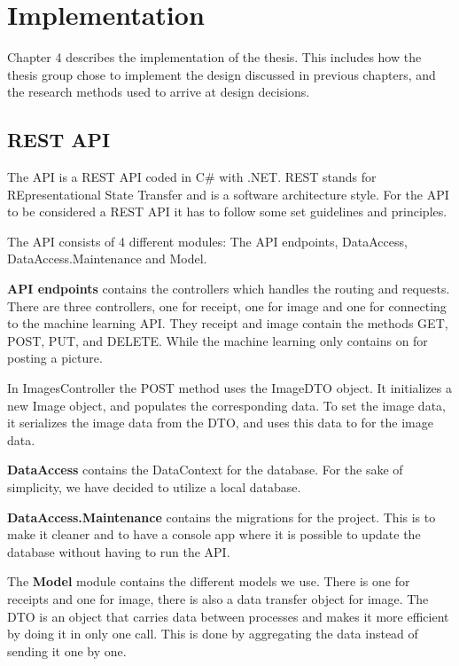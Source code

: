 \cleardoublepage
\chapter{Implementation}
\label{ch:implementation}
Chapter 4 describes the implementation of the thesis.
This includes how the thesis group chose to implement the design discussed in previous chapters, and the research methods used to arrive at design decisions.

\section{REST API}\label{sec:REST API}

The API is a REST API coded in C\# with .NET.
REST stands for REpresentational State Transfer and is a software architecture style.
For the API to be considered a REST API it has to follow some set guidelines and principles.

The API consists of 4 different modules: The API endpoints, DataAccess,\\
DataAccess.Maintenance and Model.

\textbf{API endpoints} contains the controllers which handles the routing and requests.
There are three controllers, one for receipt, one for image and one for connecting to the machine learning API\@.
They receipt and image contain the methods GET, POST, PUT, and DELETE\@.
While the machine learning only contains on  for posting a picture.

In ImagesController the POST method uses the ImageDTO object.
It initializes a new Image object, and populates the corresponding data.
To set the image data, it serializes the image data from the DTO, and uses this data to for the image data.

\textbf{DataAccess} contains the DataContext for the database.
For the sake of simplicity, we have decided to utilize a local database.

\textbf{DataAccess.Maintenance} contains the migrations for the project.
This is to make it cleaner and to have a console app where it is possible to update the database without having to run the API\@.

The \textbf{Model} module contains the different models we use.
There is one for receipts and one for image, there is also a data transfer object for image.
The DTO is an object that carries data between processes and makes it more efficient by doing it in only one call.
This is done by aggregating the data instead of sending it one by one.


